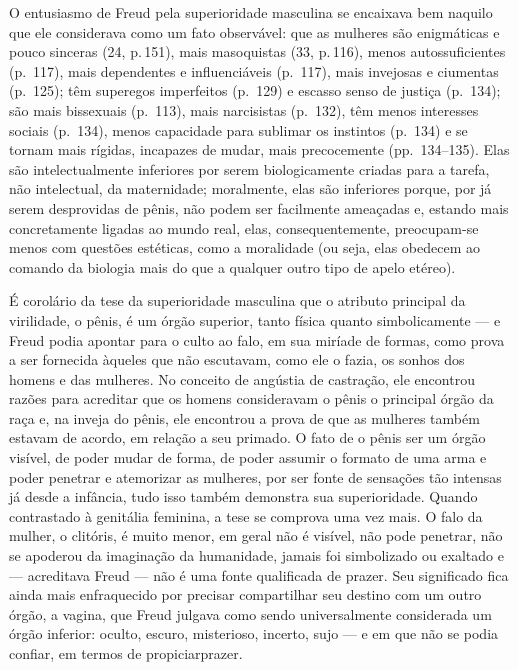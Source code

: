  O entusiasmo de Freud pela superioridade masculina se encaixava bem naquilo que ele considerava como um fato observável: que as mulheres são enigmáticas e pouco sinceras (24, p.\,151), mais masoquistas (33, p.\,116), menos autossuficientes (p.~117), mais dependentes e \mbox{influenciáveis} (p.~117), mais invejosas e ciumentas (p.~125); têm superegos imperfeitos (p.~129) e escasso senso de justiça (p.~134); são mais bissexuais (p.~113), mais narcisistas (p.~132), têm menos interesses sociais (p.~134), menos capacidade para sublimar os instintos (p.~134) e se tornam mais rígidas, incapazes de mudar, mais precocemente (pp.~134--135). Elas são intelectualmente inferiores por serem biologicamente criadas para a tarefa, não intelectual, da maternidade; moralmente, elas são inferiores porque, por já serem desprovidas de pênis, não podem ser facilmente ameaçadas e, estando mais concretamente ligadas ao mundo real, elas, consequentemente, preocupam-se menos com questões estéticas, como a moralidade (ou seja, elas obedecem ao comando da biologia mais do que a qualquer outro tipo de apelo etéreo).

 É corolário da tese da superioridade masculina que o atributo principal
da virilidade, o pênis, é um órgão superior, tanto física quanto
simbolicamente --- e Freud podia apontar para o culto ao falo, em sua
miríade de formas, como prova a ser fornecida àqueles que não
escutavam, como ele o fazia, os sonhos dos homens e das mulheres. No
conceito de angústia de castração,\idxcasta{} ele encontrou razões para acreditar
que os homens consideravam o pênis o principal órgão da raça e, na
inveja\idxinvej{} do pênis, ele encontrou a prova de que as mulheres também
estavam de acordo, em relação a seu primado. O fato de o pênis ser um
órgão visível, de poder mudar de forma, de poder assumir o formato de
uma arma e poder penetrar e atemorizar as mulheres, por ser fonte de
sensações tão intensas já desde a infância, tudo isso também demonstra
sua superioridade. Quando contrastado à genitália feminina, a tese se
comprova uma vez mais. O falo da mulher, o clitóris,\idxclit{} é muito menor, em
geral não é visível, não pode penetrar, não se apoderou da imaginação
da humanidade, jamais foi simbolizado ou exaltado e --- acreditava Freud
--- não é uma fonte qualificada de prazer. Seu significado fica ainda
mais enfraquecido por precisar compartilhar seu destino com um outro
órgão, a vagina,\idxvagin{} que Freud julgava como sendo universalmente
considerada um órgão inferior: oculto, escuro, misterioso, incerto,
sujo --- e em que não se podia confiar, em termos de propiciar\idxcondfinfe[|)] prazer.


